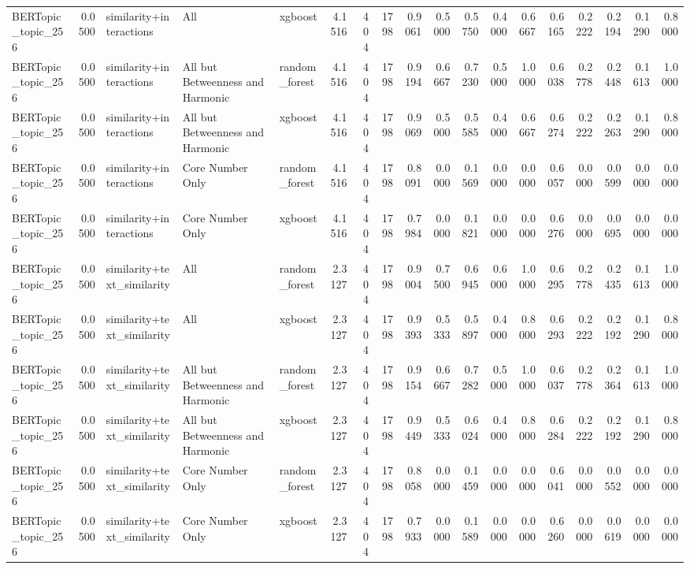 \begin{tabular}{lrlllrrrrrrrrrrrrr}
BERTopic_topic_256 & 0.0500 & similarity+interactions & All & xgboost & 4.1516 & 404 & 1798 & 0.9061 & 0.5000 & 0.5750 & 0.4000 & 0.6667 & 0.6165 & 0.2222 & 0.2194 & 0.1290 & 0.8000 \\
BERTopic_topic_256 & 0.0500 & similarity+interactions & All but Betweenness and Harmonic & random_forest & 4.1516 & 404 & 1798 & 0.9194 & 0.6667 & 0.7230 & 0.5000 & 1.0000 & 0.6038 & 0.2778 & 0.2448 & 0.1613 & 1.0000 \\
BERTopic_topic_256 & 0.0500 & similarity+interactions & All but Betweenness and Harmonic & xgboost & 4.1516 & 404 & 1798 & 0.9069 & 0.5000 & 0.5585 & 0.4000 & 0.6667 & 0.6274 & 0.2222 & 0.2263 & 0.1290 & 0.8000 \\
BERTopic_topic_256 & 0.0500 & similarity+interactions & Core Number Only & random_forest & 4.1516 & 404 & 1798 & 0.8091 & 0.0000 & 0.1569 & 0.0000 & 0.0000 & 0.6057 & 0.0000 & 0.0599 & 0.0000 & 0.0000 \\
BERTopic_topic_256 & 0.0500 & similarity+interactions & Core Number Only & xgboost & 4.1516 & 404 & 1798 & 0.7984 & 0.0000 & 0.1821 & 0.0000 & 0.0000 & 0.6276 & 0.0000 & 0.0695 & 0.0000 & 0.0000 \\
BERTopic_topic_256 & 0.0500 & similarity+text_similarity & All & random_forest & 2.3127 & 404 & 1798 & 0.9004 & 0.7500 & 0.6945 & 0.6000 & 1.0000 & 0.6295 & 0.2778 & 0.2435 & 0.1613 & 1.0000 \\
BERTopic_topic_256 & 0.0500 & similarity+text_similarity & All & xgboost & 2.3127 & 404 & 1798 & 0.9393 & 0.5333 & 0.5897 & 0.4000 & 0.8000 & 0.6293 & 0.2222 & 0.2192 & 0.1290 & 0.8000 \\
BERTopic_topic_256 & 0.0500 & similarity+text_similarity & All but Betweenness and Harmonic & random_forest & 2.3127 & 404 & 1798 & 0.9154 & 0.6667 & 0.7282 & 0.5000 & 1.0000 & 0.6037 & 0.2778 & 0.2364 & 0.1613 & 1.0000 \\
BERTopic_topic_256 & 0.0500 & similarity+text_similarity & All but Betweenness and Harmonic & xgboost & 2.3127 & 404 & 1798 & 0.9449 & 0.5333 & 0.6024 & 0.4000 & 0.8000 & 0.6284 & 0.2222 & 0.2192 & 0.1290 & 0.8000 \\
BERTopic_topic_256 & 0.0500 & similarity+text_similarity & Core Number Only & random_forest & 2.3127 & 404 & 1798 & 0.8058 & 0.0000 & 0.1459 & 0.0000 & 0.0000 & 0.6041 & 0.0000 & 0.0552 & 0.0000 & 0.0000 \\
BERTopic_topic_256 & 0.0500 & similarity+text_similarity & Core Number Only & xgboost & 2.3127 & 404 & 1798 & 0.7933 & 0.0000 & 0.1589 & 0.0000 & 0.0000 & 0.6260 & 0.0000 & 0.0619 & 0.0000 & 0.0000 \\

\end{tabular}
